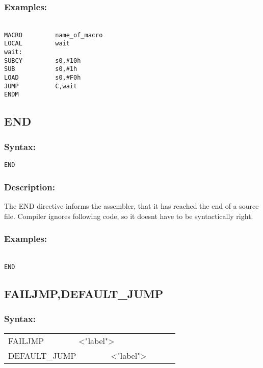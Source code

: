 {        \subsubsection{Examples:}
            {
            ~\\
            \usecodefont
                \verb'MACRO         name_of_macro'\\
                \verb'LOCAL         wait'\\
                \verb'wait:'\\
                \verb'SUBCY         s0,#10h'\\
                \verb'SUB           s0,#1h' \\
                \verb'LOAD          s0,#F0h'\\
                \verb'JUMP          C,wait'\\
                \verb'ENDM'\\
            }
            
    \subsection{END}
        \subsubsection{Syntax:}
            \verb'END'

        \subsubsection{Description:}
        The END directive informs the assembler, that it has reached the end of a source file. Compiler ignores following code, so it doesnt have to be
        syntactically right.

        \subsubsection{Examples:}
            {
                ~\\
                \usecodefont
                \verb'END'
            }

    \subsection{FAILJMP,DEFAULT\_JUMP}
        \subsubsection{Syntax:}
         {
                \texttt{}
                \begin{tabular}[h!]{llll}
                        { \color{highlight_directive} FAILJMP }\verb`       `{ \color{highlight_string} <"label"> }\\
                        { \color{highlight_directive} DEFAULT\_JUMP }\verb`       `{ \color{highlight_string} <"label"> }\\
                \end{tabular}
            }
            
}
